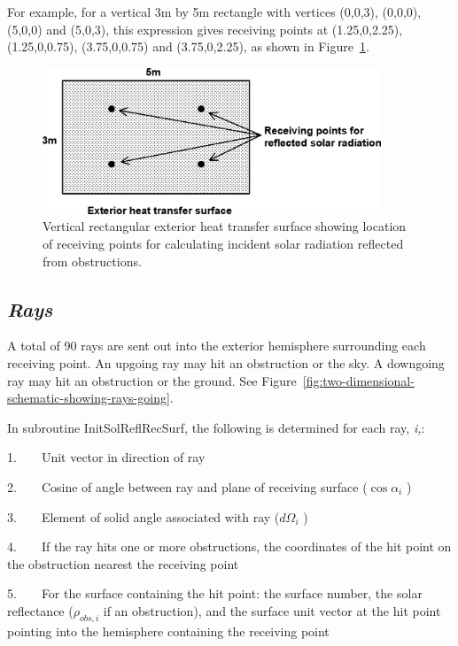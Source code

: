 For example, for a vertical 3m by 5m rectangle with vertices (0,0,3), (0,0,0), (5,0,0) and (5,0,3), this expression gives receiving points at (1.25,0,2.25), (1.25,0,0.75), (3.75,0,0.75) and (3.75,0,2.25), as shown in Figure~\ref{fig:vertical-rectangular-exterior-heat-transfer}.

\begin{figure}[hbtp] %
\centering
\includegraphics[width=0.9\textwidth, height=0.9\textheight, keepaspectratio=true]{media/image676.png}
\caption{Vertical rectangular exterior heat transfer surface showing location of receiving points for calculating incident solar radiation reflected from obstructions. \protect \label{fig:vertical-rectangular-exterior-heat-transfer}}
\end{figure}

\subsection{\texorpdfstring{\emph{Rays}}{Rays}}\label{rays}

A total of 90 rays are sent out into the exterior hemisphere surrounding each receiving point. An upgoing ray may hit an obstruction or the sky. A downgoing ray may hit an obstruction or the ground. See Figure~\ref{fig:two-dimensional-schematic-showing-rays-going}.

In subroutine InitSolReflRecSurf, the following is determined for each ray, \emph{i,}:

1.~~~~Unit vector in direction of ray

2.~~~~Cosine of angle between ray and plane of receiving surface (\(\cos {\alpha_i}\) )

3.~~~~Element of solid angle associated with ray (\(d{\Omega_i}\) )

4.~~~~If the ray hits one or more obstructions, the coordinates of the hit point on the obstruction nearest the receiving point

5.~~~~For the surface containing the hit point: the surface number, the solar reflectance (\({\rho_{obs,i}}\) if an obstruction), and the surface unit vector at the hit point pointing into the hemisphere containing the receiving point

